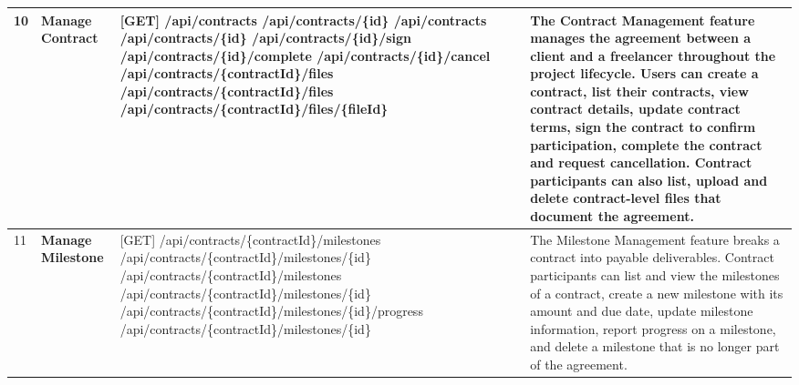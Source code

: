 \begin{longtable}{|C{0.7cm}|L{2.6cm}|S{6.6cm}|L{5.2cm}|}
10
&
\textbf{Manage Contract}
&
[GET] /\allowbreak{}api/\allowbreak{}contracts \newline
[GET] /\allowbreak{}api/\allowbreak{}contracts/\allowbreak{}\{id\} \newline
[POST] /\allowbreak{}api/\allowbreak{}contracts \newline
[PATCH] /\allowbreak{}api/\allowbreak{}contracts/\allowbreak{}\{id\} \newline
[PATCH] /\allowbreak{}api/\allowbreak{}contracts/\allowbreak{}\{id\}/\allowbreak{}sign \newline
[PATCH] /\allowbreak{}api/\allowbreak{}contracts/\allowbreak{}\{id\}/\allowbreak{}complete \newline
[PATCH] /\allowbreak{}api/\allowbreak{}contracts/\allowbreak{}\{id\}/\allowbreak{}cancel \newline
[GET] /\allowbreak{}api/\allowbreak{}contracts/\allowbreak{}\{contractId\}/\allowbreak{}files \newline
[POST] /\allowbreak{}api/\allowbreak{}contracts/\allowbreak{}\{contractId\}/\allowbreak{}files \newline
[DELETE] /\allowbreak{}api/\allowbreak{}contracts/\allowbreak{}\{contractId\}/\allowbreak{}files/\allowbreak{}\{fileId\}
&
The Contract Management feature manages the agreement between a client and a freelancer throughout the project lifecycle. Users can create a contract, list their contracts, view contract details, update contract terms, sign the contract to confirm participation, complete the contract and request cancellation. Contract participants can also list, upload and delete contract-level files that document the agreement.
\\ \hline

11
&
\textbf{Manage Milestone}
&
[GET] /\allowbreak{}api/\allowbreak{}contracts/\allowbreak{}\{contractId\}/\allowbreak{}milestones \newline
[GET] /\allowbreak{}api/\allowbreak{}contracts/\allowbreak{}\{contractId\}/\allowbreak{}milestones/\allowbreak{}\{id\} \newline
[POST] /\allowbreak{}api/\allowbreak{}contracts/\allowbreak{}\{contractId\}/\allowbreak{}milestones \newline
[PATCH] /\allowbreak{}api/\allowbreak{}contracts/\allowbreak{}\{contractId\}/\allowbreak{}milestones/\allowbreak{}\{id\} \newline
[PATCH] /\allowbreak{}api/\allowbreak{}contracts/\allowbreak{}\{contractId\}/\allowbreak{}milestones/\allowbreak{}\{id\}/\allowbreak{}progress \newline
[DELETE] /\allowbreak{}api/\allowbreak{}contracts/\allowbreak{}\{contractId\}/\allowbreak{}milestones/\allowbreak{}\{id\}
&
The Milestone Management feature breaks a contract into payable deliverables. Contract participants can list and view the milestones of a contract, create a new milestone with its amount and due date, update milestone information, report progress on a milestone, and delete a milestone that is no longer part of the agreement.
\\ \hline


\end{longtable}
